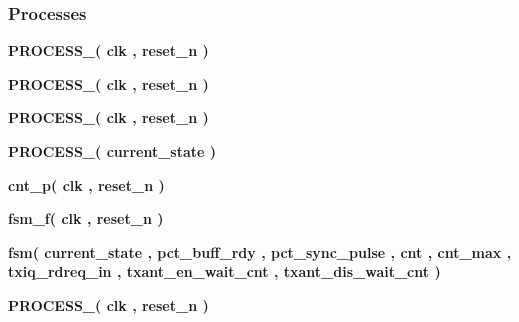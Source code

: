 \subsubsection*{Processes}
 \begin{DoxyCompactItemize}
\item 
{\bf P\+R\+O\+C\+E\+S\+S\+\_}{\bfseries  ( {\bfseries {\bfseries {\bf clk}} \textcolor{vhdlchar}{ }} , {\bfseries {\bfseries {\bf reset\+\_\+n}} \textcolor{vhdlchar}{ }} )}
\item 
{\bf P\+R\+O\+C\+E\+S\+S\+\_}{\bfseries  ( {\bfseries {\bfseries {\bf clk}} \textcolor{vhdlchar}{ }} , {\bfseries {\bfseries {\bf reset\+\_\+n}} \textcolor{vhdlchar}{ }} )}
\item 
{\bf P\+R\+O\+C\+E\+S\+S\+\_}{\bfseries  ( {\bfseries {\bfseries {\bf clk}} \textcolor{vhdlchar}{ }} , {\bfseries {\bfseries {\bf reset\+\_\+n}} \textcolor{vhdlchar}{ }} )}
\item 
{\bf P\+R\+O\+C\+E\+S\+S\+\_}{\bfseries  ( {\bfseries {\bfseries {\bf current\+\_\+state}} \textcolor{vhdlchar}{ }} )}
\item 
{\bf cnt\+\_\+p}{\bfseries  ( {\bfseries {\bfseries {\bf clk}} \textcolor{vhdlchar}{ }} , {\bfseries {\bfseries {\bf reset\+\_\+n}} \textcolor{vhdlchar}{ }} )}
\item 
{\bf fsm\+\_\+f}{\bfseries  ( {\bfseries {\bfseries {\bf clk}} \textcolor{vhdlchar}{ }} , {\bfseries {\bfseries {\bf reset\+\_\+n}} \textcolor{vhdlchar}{ }} )}
\item 
{\bf fsm}{\bfseries  ( {\bfseries {\bfseries {\bf current\+\_\+state}} \textcolor{vhdlchar}{ }} , {\bfseries {\bfseries {\bf pct\+\_\+buff\+\_\+rdy}} \textcolor{vhdlchar}{ }} , {\bfseries {\bfseries {\bf pct\+\_\+sync\+\_\+pulse}} \textcolor{vhdlchar}{ }} , {\bfseries {\bfseries {\bf cnt}} \textcolor{vhdlchar}{ }} , {\bfseries {\bfseries {\bf cnt\+\_\+max}} \textcolor{vhdlchar}{ }} , {\bfseries {\bfseries {\bf txiq\+\_\+rdreq\+\_\+in}} \textcolor{vhdlchar}{ }} , {\bfseries {\bfseries {\bf txant\+\_\+en\+\_\+wait\+\_\+cnt}} \textcolor{vhdlchar}{ }} , {\bfseries {\bfseries {\bf txant\+\_\+dis\+\_\+wait\+\_\+cnt}} \textcolor{vhdlchar}{ }} )}
\item 
{\bf P\+R\+O\+C\+E\+S\+S\+\_}{\bfseries  ( {\bfseries {\bfseries {\bf clk}} \textcolor{vhdlchar}{ }} , {\bfseries {\bfseries {\bf reset\+\_\+n}} \textcolor{vhdlchar}{ }} )}
\end{DoxyCompactItemize}
